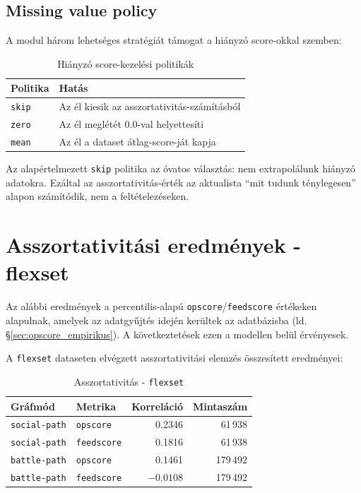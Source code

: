 ﻿\documentclass[a4paper,12pt]{report}
\begin{document}
\subsection{Missing value policy}

A modul három lehetséges stratégiát támogat a hiányzó score-okkal szemben:

\begin{table}[H]
\centering
\caption{Hiányzó score-kezelési politikák}
\begin{tabular}{ll}
\toprule
\textbf{Politika} & \textbf{Hatás} \\
\midrule
\texttt{skip} & Az él kiesik az asszortativitás-számításból \\
\texttt{zero} & Az él meglétét 0.0-val helyettesíti \\
\texttt{mean} & Az él a dataset átlag-score-ját kapja \\
\bottomrule
\end{tabular}
\end{table}

Az alapértelmezett \texttt{skip} politika az óvatos választás: nem extrapolálunk hiányzó adatokra. Ezáltal az asszortativitás-érték az aktualista ``mit tudunk ténylegesen'' alapon számítódik, nem a feltételezéseken.

\section{Asszortativitási eredmények - flexset}

Az alábbi eredmények a percentilis-alapú \texttt{opscore}/\texttt{feedscore} értékeken alapulnak, amelyek az adatgyűjtés idején kerültek az adatbázisba (ld. \S\ref{sec:opscore_empirikus}). A következtetések ezen a modellen belül érvényesek.

A \texttt{flexset} dataseten elvégzett asszortativitási elemzés összesített eredményei:

\begin{table}[H]
\centering
\caption{Asszortativitás - \texttt{flexset}}
\begin{tabular}{llrr}
\toprule
\textbf{Gráfmód} & \textbf{Metrika} & \textbf{Korreláció} & \textbf{Mintaszám} \\
\midrule
\texttt{social-path} & \texttt{opscore} & 0.2346 & 61\,938 \\
\texttt{social-path} & \texttt{feedscore} & 0.1816 & 61\,938 \\
\texttt{battle-path} & \texttt{opscore} & 0.1461 & 179\,492 \\
\texttt{battle-path} & \texttt{feedscore} & $-0.0108$ & 179\,492 \\
\bottomrule
\end{tabular}
\end{table}
\end{document}
